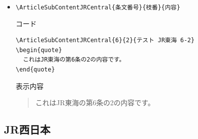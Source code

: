 \documentclass[oneside,10pt,a4paper]{jsarticle}
\begin{document}
\begin{itemize}
\begin{itembox}[l]{表示内容}
      \end{itembox}
    \item \verb|\ArticleSubContentJRCentral{条文番号}{枝番}{内容}|
      \begin{itembox}[l]{コード}
        \begin{verbatim}
\ArticleSubContentJRCentral{6}{2}{テスト JR東海 6-2}
\begin{quote}
  これはJR東海の第6条の2の内容です。
\end{quote}\end{verbatim}
      \end{itembox}
      \begin{itembox}[l]{表示内容}
        \begin{quote}
          これはJR東海の第6条の2の内容です。
        \end{quote}
      \end{itembox}
  \end{itemize}

  \newpage

  \subsection{JR西日本}
\end{document}
